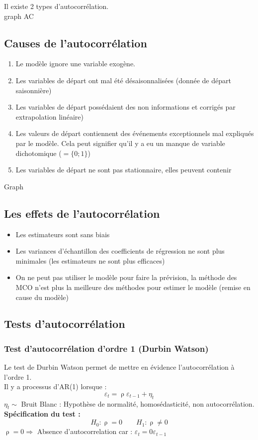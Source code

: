 \documentclass{article}
\begin{document}
Il existe 2 types d'autocorrélation. \\
graph AC

\subsection{Causes de l'autocorrélation}
\begin{enumerate}
	\item Le modèle ignore une variable exogène.
	\item Les variables de départ ont mal été désaisonnalisées (donnée de départ saisonnière)
	\item Les variables de départ possédaient des non informations et corrigés par extrapolation linéaire)
	\item Les valeurs de départ contiennent des événements exceptionnels mal expliqués par le modèle. Cela peut signifier qu'il y a eu un manque de variable dichotomique ($= \{0;1\}$)
	\item Les variables de départ ne sont pas stationnaire, elles peuvent contenir 
\end{enumerate}
Graph

\subsection{Les effets de l'autocorrélation}
\begin{itemize}
	\item Les estimateurs sont sans biais
	\item Les variances d'échantillon des coefficients de régression ne sont plus minimales (les estimateurs ne sont plus efficaces)
	\item On ne peut pas utiliser le modèle pour faire la prévision, la méthode des MCO n'est plus la meilleure des méthodes pour estimer le modèle (remise en cause du modèle)
\end{itemize}
\subsection{Tests d'autocorrélation}
\subsubsection{Test d'autocorrélation d'ordre 1 (Durbin Watson)}
Le test de Durbin Watson permet de mettre en évidence l'autocorrélation à l'ordre 1.\\
Il y a processus d'AR(1) lorsque :
\begin{equation*}
	\varepsilon_t = \uprho \varepsilon_{t-1} + \eta_t
\end{equation*}
$\eta_t \sim$ Bruit Blanc : Hypothèse de normalité, homosédasticité, non autocorrélation. \\
\textbf{Spécification du test :}
\begin{equation*}
	H_0 : \uprho = 0 \qquad H_1 : \uprho \neq 0
\end{equation*}
{\color{ForestGreen} $\uprho=0 \Rightarrow$ Absence d'autocorrelation car : $\varepsilon_t = 0\varepsilon_{t-1}$} 
\end{document}
